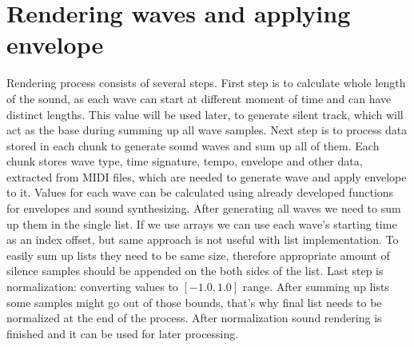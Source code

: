 \documentclass[runningheads]{llncs}
\begin{document}
\section{Rendering waves and applying envelope}

Rendering process consists of several steps. First step is to calculate whole length of the sound, as each wave can start at different moment of time and can have distinct lengths. This value will be used later, to generate silent track, which will act as the base during summing up all wave samples.  Next step is to process data stored in each chunk to generate sound waves and sum up all of them. Each chunk stores wave type, time signature, tempo, envelope and other data, extracted from MIDI files, which are needed to generate wave and apply envelope to it. Values for each wave can be calculated using already developed functions for envelopes and sound synthesizing. After generating all waves we need to sum up them in the single list. If we use arrays we can use each wave’s starting time as an index offset, but same approach is not useful with list implementation. To easily sum up lists they need to be same size, therefore appropriate amount of silence samples should be appended on the both sides of the list. Last step is normalization: converting values to \([-1.0, 1.0]\) range. After summing up lists some samples might go out of those bounds, that’s why final list needs to be normalized at the end of the process. After normalization sound rendering is finished and it can be used for later processing.
\end{document}
